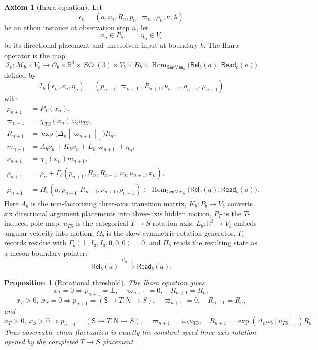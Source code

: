 \documentclass[11pt]{article}
\theoremstyle{definition}
\newtheorem{axiom}[definition]{Axiom}
\theoremstyle{plain}
\newtheorem{proposition}[definition]{Proposition}
\newcommand{\Npole}{\mathsf N}
\newcommand{\Spole}{\mathsf S}
\newcommand{\Rel}{\mathsf{Rel}}
\newcommand{\Read}{\mathsf{Read}}
\newcommand{\GenMes}{\mathsf{GenMes}}
\newcommand{\Ihara}{\mathcal I}
\DeclareMathOperator{\Hom}{Hom}
\DeclareMathOperator{\SO}{SO}
\begin{document}
\begin{axiom}[Ihara equation]
Let
\[
  \epsilon_n=(a,\nu_n,R_n,p_n,\varpi_n,\rho_n,\kappa,\lambda)
\]
be an ethon instance at observation step \(n\), let
\[
  x_n\in P_b,
  \qquad
  \eta_n\in V_b
\]
be its directional placement and unresolved input at boundary \(b\).  The
Ihara operator is the map
\[
  \Ihara_b:
  \mathcal M_b\times V_b
  \longrightarrow
  \mathcal O_b\times\mathbb R^3\times\SO(3)\times V_b\times R_b
  \times
  \Hom_{\GenMes_b}\bigl(\Rel_b(a),\Read_b(a)\bigr)
\]
defined by
\[
  \boxed{
  \Ihara_b(\epsilon_n,x_n,\eta_n)
  =
  (p_{n+1},\varpi_{n+1},R_{n+1},\nu_{n+1},\rho_{n+1},\mu_{n+1})
  }
\]
with
\[
\begin{aligned}
  p_{n+1}
  &=
  P_T(x_n),
  \\
  \varpi_{n+1}
  &=
  \chi_{TS}(x_n)\,\omega_bu_{TS},
  \\
  R_{n+1}
  &=
  \exp\!\bigl(\Delta_n[\varpi_{n+1}]_\times\bigr)R_n,
  \\
  m_{n+1}
  &=
  A_b\nu_n+K_bx_n+L_b\varpi_{n+1}+\eta_n,
  \\
  \nu_{n+1}
  &=
  \chi_1(x_n)m_{n+1},
  \\
  \rho_{n+1}
  &=
  \rho_n+\Gamma_b(p_{n+1},R_n,R_{n+1},\nu_n,\nu_{n+1},x_n),
  \\
  \mu_{n+1}
  &=
  \Pi_b(a,p_{n+1},R_{n+1},\nu_{n+1},\rho_{n+1})
  \in
  \Hom_{\GenMes_b}\bigl(\Rel_b(a),\Read_b(a)\bigr).
\end{aligned}
\]
Here \(A_b\) is the non-factorizing three-axis transition matrix,
\(K_b:P_b\to V_b\) converts six directional argument placements into
three-axis hidden motion, \(P_T\) is the \(T\)-induced pole map,
\(u_{TS}\) is the categorical \(T\to S\) rotation axis,
\(L_b:\mathbb R^3\to V_b\) embeds angular velocity into motion,
\(\Omega_b\) is the
skew-symmetric rotation generator, \(\Gamma_b\) records residue with
\(\Gamma_b(\bot,I_3,I_3,0,0,0)=0\), and \(\Pi_b\) reads the resulting
state as a meson-boundary pointer:
\[
  \Rel_b(a)
  \xrightarrow{\ \mu_{n+1}\ }
  \Read_b(a).
\]
\end{axiom}

\begin{proposition}[Rotational threshold]
The Ihara equation gives
\[
  x_T=0
  \Rightarrow
  p_{n+1}=\bot,\quad
  \varpi_{n+1}=0,\quad
  R_{n+1}=R_n,
\]
\[
  x_T>0,\ x_S=0
  \Rightarrow
  p_{n+1}=(\Spole\to T,\Npole\to S),\quad
  \varpi_{n+1}=0,\quad
  R_{n+1}=R_n,
\]
and
\[
  x_T>0,\ x_S>0
  \Rightarrow
  p_{n+1}=(\Spole\to T,\Npole\to S),\quad
  \varpi_{n+1}=\omega_bu_{TS},\quad
  R_{n+1}=\exp(\Delta_n\omega_b[u_{TS}]_\times)R_n.
\]
Thus observable ethon fluctuation is exactly the constant-speed
three-axis rotation opened by the completed \(T\to S\) placement.
\end{proposition}
\end{document}
